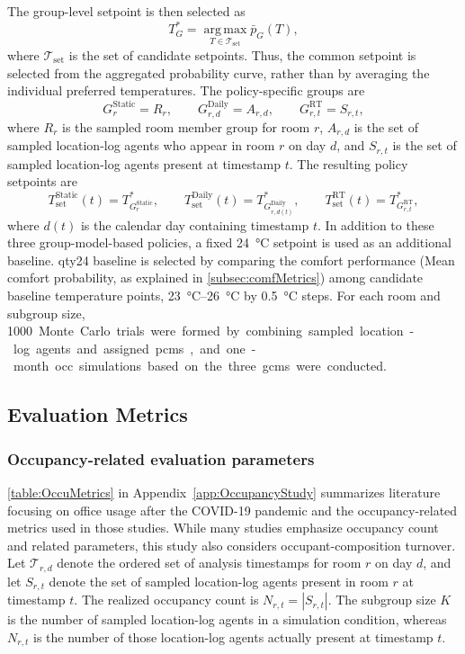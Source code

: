 The group-level setpoint is then selected as
\begin{equation}
T_G^{*}
=
\operatorname*{arg\,max}_{T\in\mathcal{T}_{\mathrm{set}}}
\bar{p}_{G}(T),
\label{eq:gcm_optimal_setpoint}
\end{equation}
where $\mathcal{T}_{\mathrm{set}}$ is the set of candidate setpoints.
Thus, the common setpoint is selected from the aggregated probability curve, rather than by averaging the individual preferred temperatures.
The policy-specific groups are
\begin{equation}
G_{r}^{\mathrm{Static}} = R_r,
\qquad
G_{r,d}^{\mathrm{Daily}} = A_{r,d},
\qquad
G_{r,t}^{\mathrm{RT}} = S_{r,t},
\label{eq:policy_groups}
\end{equation}
where $R_r$ is the sampled room member group for room $r$, $A_{r,d}$ is the set of sampled location-log agents who appear in room $r$ on day $d$, and $S_{r,t}$ is the set of sampled location-log agents present at timestamp $t$.
The resulting policy setpoints are
\begin{equation}
T_{\mathrm{set}}^{\mathrm{Static}}(t)=T_{G_{r}^{\mathrm{Static}}}^{*},
\qquad
T_{\mathrm{set}}^{\mathrm{Daily}}(t)=T_{G_{r,d(t)}^{\mathrm{Daily}}}^{*},
\qquad
T_{\mathrm{set}}^{\mathrm{RT}}(t)=T_{G_{r,t}^{\mathrm{RT}}}^{*},
\label{eq:policy_setpoints}
\end{equation}
where $d(t)$ is the calendar day containing timestamp $t$.
In addition to these three group-model-based policies, a fixed \qty{24}{\celsius} setpoint is used as an additional baseline.
qty{24}{\celsius} baseline is selected by comparing the comfort performance (Mean comfort probability, as explained in \autoref{subsec:comfMetrics}) among candidate baseline temperature points, \qtyrange{23}{26}{\celsius} by \qty{0.5}{\celsius} steps.
For each room and subgroup size, \qty{1000} Monte Carlo trials were formed by combining sampled location-log agents and assigned \acp{pcm}, and one-month \ac{occ} simulations based on the three \acp{gcm} were conducted.

\subsection{Evaluation Metrics}
\label{sec:EvalMet}

\subsubsection{Occupancy-related evaluation parameters}
\label{sec:OccuMetrics}
\autoref{table:OccuMetrics} in Appendix~\ref{app:OccupancyStudy} summarizes literature focusing on office usage after the COVID-19 pandemic and the occupancy-related metrics used in those studies.
While many studies emphasize occupancy count and related parameters, this study also considers occupant-composition turnover.
Let $\mathcal{T}_{r,d}$ denote the ordered set of analysis timestamps for room $r$ on day $d$, and let $S_{r,t}$ denote the set of sampled location-log agents present in room $r$ at timestamp $t$.
The realized occupancy count is $N_{r,t}=|S_{r,t}|$.
The subgroup size $K$ is the number of sampled location-log agents in a simulation condition, whereas $N_{r,t}$ is the number of those location-log agents actually present at timestamp $t$.

